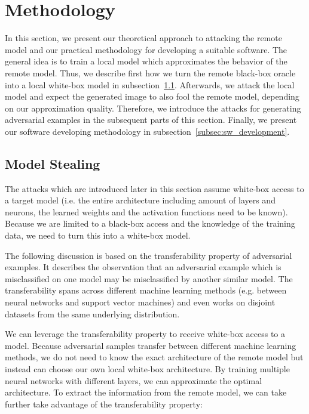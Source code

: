 
\section{Methodology}\label{sec:methodology}

In this section, we present our theoretical approach to attacking the remote model and our practical methodology for developing a suitable software.
The general idea is to train a local model which approximates the behavior of the remote model.
Thus, we describe first how we turn the remote black-box oracle into a local white-box model in subsection~\ref{subsec:modelstealing}.
Afterwards, we attack the local model and expect the generated image to also fool the remote model, depending on our approximation quality.
Therefore, we introduce the attacks for generating adversarial examples in the subsequent parts of this section.
Finally, we present our software developing methodology in subsection~\ref{subsec:sw_development}.

\subsection{Model Stealing}\label{subsec:modelstealing}

The attacks which are introduced later in this section assume white-box access to a target model (i.e. the entire architecture including amount of layers and neurons, the learned weights and the activation functions need to be known).
Because we are limited to a black-box access and the knowledge of the training data, we need to turn this into a white-box model.

The following discussion is based on the transferability property of adversarial examples.
It describes the observation that an adversarial example which is misclassified on one model may be misclassified by another similar model.
The transferability spans across different machine learning methods (e.g. between neural networks and support vector machines) and even works on disjoint datasets from the same underlying distribution. \cite{papernot2016transferability,goodfellow6572explaining, szegedy2013intriguing}

We can leverage the transferability property to receive white-box access to a model.
Because adversarial samples transfer between different machine learning methods, we do not need to know the exact architecture of the remote model but instead can choose our own local white-box architecture.
By training multiple neural networks with different layers, we can approximate the optimal architecture.
To extract the information from the remote model, we can take further take advantage of the transferability property:

